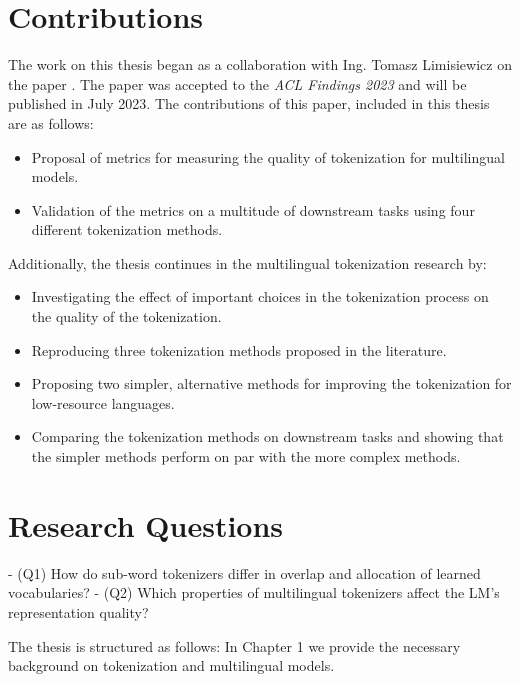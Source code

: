 
\section{Contributions}

The work on this thesis began as a collaboration with Ing. Tomasz Limisiewicz on the paper . The paper was accepted to the \textit{ACL Findings 2023} and will be published in July 2023. The contributions of this paper, included in this thesis are as follows:

\begin{itemize}
    \item Proposal of metrics for measuring the quality of tokenization for multilingual models.
    \item Validation of the metrics on a multitude of downstream tasks using four different tokenization methods.
\end{itemize}

Additionally, the thesis continues in the multilingual tokenization research by:

\begin{itemize}
    \item Investigating the effect of important choices in the tokenization process on the quality of the tokenization.
    \item Reproducing three tokenization methods proposed in the literature.
    \item Proposing two simpler, alternative methods for improving the tokenization for low-resource languages.
    \item Comparing the tokenization methods on downstream tasks and showing that the simpler methods perform on par with the more complex methods.
\end{itemize}

\section{Research Questions}


- (Q1) How do sub-word tokenizers differ in overlap and allocation of learned vocabularies?
- (Q2) Which properties of multilingual tokenizers affect the LM’s representation quality?



The thesis is structured as follows: In Chapter 1 we provide the necessary background on tokenization and multilingual models.  

